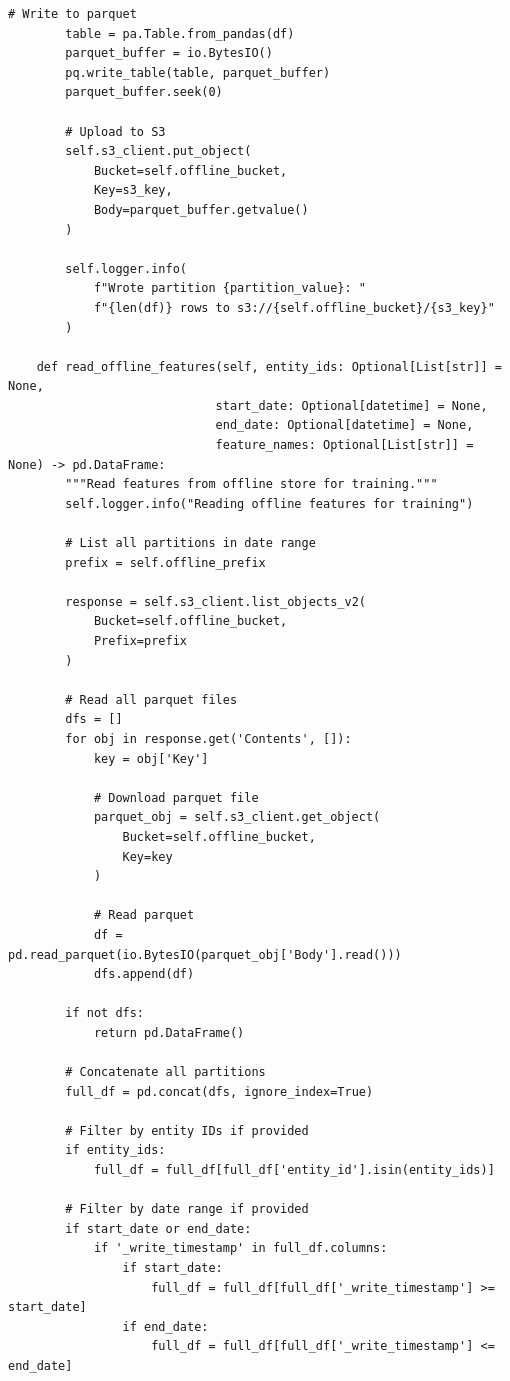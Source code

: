 \begin{lstlisting}[style=python, caption=FeatureStoreIntegrator with Dual Serving Modes]
        # Write to parquet
        table = pa.Table.from_pandas(df)
        parquet_buffer = io.BytesIO()
        pq.write_table(table, parquet_buffer)
        parquet_buffer.seek(0)

        # Upload to S3
        self.s3_client.put_object(
            Bucket=self.offline_bucket,
            Key=s3_key,
            Body=parquet_buffer.getvalue()
        )

        self.logger.info(
            f"Wrote partition {partition_value}: "
            f"{len(df)} rows to s3://{self.offline_bucket}/{s3_key}"
        )

    def read_offline_features(self, entity_ids: Optional[List[str]] = None,
                             start_date: Optional[datetime] = None,
                             end_date: Optional[datetime] = None,
                             feature_names: Optional[List[str]] = None) -> pd.DataFrame:
        """Read features from offline store for training."""
        self.logger.info("Reading offline features for training")

        # List all partitions in date range
        prefix = self.offline_prefix

        response = self.s3_client.list_objects_v2(
            Bucket=self.offline_bucket,
            Prefix=prefix
        )

        # Read all parquet files
        dfs = []
        for obj in response.get('Contents', []):
            key = obj['Key']

            # Download parquet file
            parquet_obj = self.s3_client.get_object(
                Bucket=self.offline_bucket,
                Key=key
            )

            # Read parquet
            df = pd.read_parquet(io.BytesIO(parquet_obj['Body'].read()))
            dfs.append(df)

        if not dfs:
            return pd.DataFrame()

        # Concatenate all partitions
        full_df = pd.concat(dfs, ignore_index=True)

        # Filter by entity IDs if provided
        if entity_ids:
            full_df = full_df[full_df['entity_id'].isin(entity_ids)]

        # Filter by date range if provided
        if start_date or end_date:
            if '_write_timestamp' in full_df.columns:
                if start_date:
                    full_df = full_df[full_df['_write_timestamp'] >= start_date]
                if end_date:
                    full_df = full_df[full_df['_write_timestamp'] <= end_date]


\end{lstlisting}
